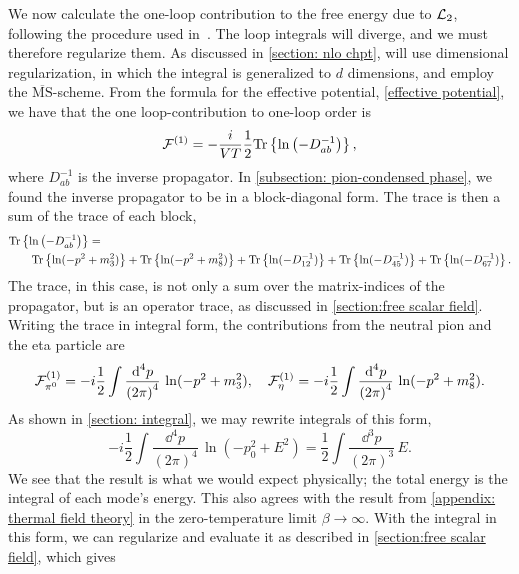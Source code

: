 We now calculate the one-loop contribution to the free energy due to $\mathcal{L}_2$, following the procedure used in~\autocite{adhikariTwoflavorChiralPerturbation2019,martinariaTwoflavorChiralPerturbation2020,adhikariQuarkPionAxial2021}.
The loop integrals will diverge, and we must therefore regularize them.
As discussed in \autoref{section: nlo chpt}, will use dimensional regularization, in which the integral is generalized to $d$ dimensions, and employ the $\overline{\mathrm{MS}}$-scheme.
From the formula for the effective potential, \autoref{effective potential}, we have that the one loop-contribution to one-loop order is 
%
\begin{equation}
    \mathcal{F}^{(1)}
    =
    - \frac{i}{V T} \frac{1}{2}
    \text{Tr} \left\{ \ln\left( - D_{ab}^{-1}\right) \right\},
\end{equation}
%
where $D_{ab}^{-1}$ is the inverse propagator.
In \autoref{subsection: pion-condensed phase}, we found the inverse propagator to be in a block-diagonal form.
The trace is then a sum of the trace of each block,
%
\begin{align}
    \nonumber
    &\text{Tr} \left\{ \ln\left( - D_{ab}^{-1}\right) \right\}
    =\\\nonumber
    &\quad\quad
    \text{Tr} \left\{ \ln(-p^2 + m_3^2) \right\}
    + \text{Tr} \left\{ \ln(-p^2 + m_8^2) \right\}
    + \text{Tr} \left\{ \ln(-D_{12}^{-1}) \right\}
    + \text{Tr} \left\{ \ln(-D_{45}^{-1}) \right\}
    + \text{Tr} \left\{ \ln(-D_{67}^{-1}) \right\}.
\end{align}
%
The trace, in this case, is not only a sum over the matrix-indices of the propagator, but is an operator trace, as discussed in \autoref{section:free scalar field}.
Writing the trace in integral form, the contributions from the neutral pion and the eta particle are
%
\begin{align}
    \mathcal{F}_{\pi^0}^{(1)}
    = -i\frac{1}{2} \int \frac{\text{d}^4 p}{{(2\pi)}^4}\, \ln(-p^2 + m_3^2), \quad
    \mathcal{F}_{\eta}^{(1)}
    = -i\frac{1}{2} \int \frac{\text{d}^4 p}{{(2\pi)}^4}\, \ln(-p^2 + m_8^2).
\end{align}
%
As shown in \autoref{section: integral}, we may rewrite integrals of this form,
%
\begin{equation}
    -i\frac{1}{2} \int \frac{\dd^4 p}{{(2\pi)}^4}\, \ln(-p_0^2 + E^2)
    = \frac{1}{2} \int  \frac{\dd^3 p}{{(2\pi)}^3 } \, E.
\end{equation}
%
We see that the result is what we would expect physically; the total energy is the integral of each mode's energy.
This also agrees with the result from \autoref{appendix: thermal field theory} in the zero-temperature limit $\beta \rightarrow \infty$.
With the integral in this form, we can regularize and evaluate it as described in  \autoref{section:free scalar field}, which gives
